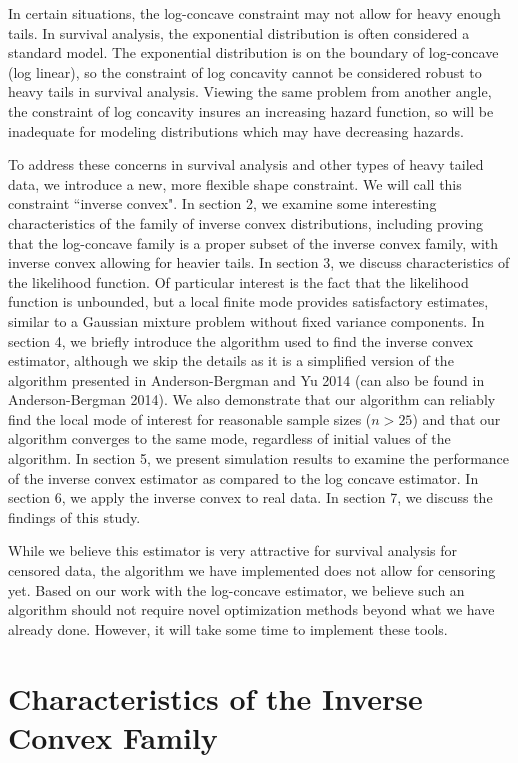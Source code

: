 \documentclass[11pt]{article}
\numberwithin{equation}{section}
\begin{document}
	 In certain situations, the log-concave constraint may not allow for heavy enough tails. In survival analysis, the exponential distribution is often considered a standard model. The exponential distribution is on the boundary of log-concave (log linear), so the constraint of log concavity cannot be considered robust to heavy tails in survival analysis. Viewing the same problem from another angle, the constraint of log concavity insures an increasing hazard function, so will be inadequate for modeling distributions which may have decreasing hazards. 	
	 
	 To address these concerns in survival analysis and other types of heavy tailed data, we introduce a new, more flexible shape constraint. We will call this constraint ``inverse convex". In section 2, we examine some interesting characteristics of the family of inverse convex distributions, including proving that the log-concave family is a proper subset of the inverse convex family, with inverse convex allowing for heavier tails. In section 3, we discuss characteristics of the likelihood function. Of particular interest is the fact that the likelihood function is unbounded, but a local finite mode provides satisfactory estimates, similar to a Gaussian mixture problem without fixed variance components. In section 4, we briefly introduce the algorithm used to find the inverse convex estimator, although we skip the details as it is a simplified version of the algorithm presented in Anderson-Bergman and Yu 2014 (can also be found in Anderson-Bergman 2014). We also demonstrate that our algorithm can reliably find the local mode of interest for reasonable sample sizes ($n > 25$) and that our algorithm converges to the same mode, regardless of initial values of the algorithm. In section 5, we present simulation results to examine the performance of the inverse convex estimator as compared to the log concave estimator. In section 6, we apply the inverse convex to real data. In section 7, we discuss the findings of this study.
	 
	 While we believe this estimator is very attractive for survival analysis for censored data, the algorithm we have implemented does not allow for censoring yet. Based on our work with the log-concave estimator, we believe such an algorithm should not require novel optimization methods beyond what we have already done. However, it will take some time to implement these tools. 
	 
	 
{\section{Characteristics of the Inverse Convex Family} }
		
\end{document}
